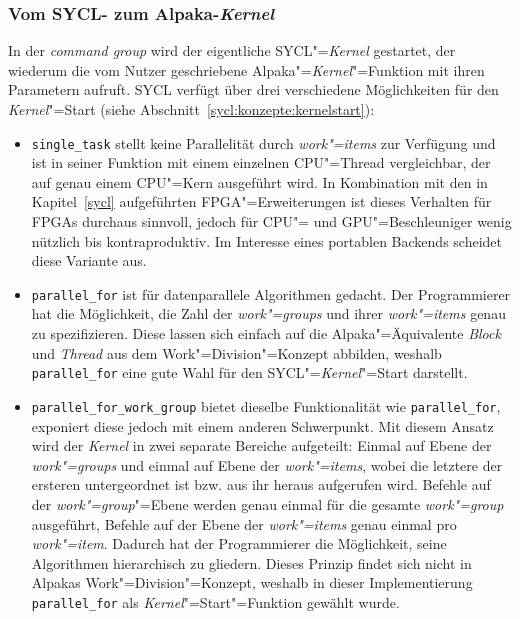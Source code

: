 \subsubsection{Vom SYCL- zum Alpaka-\textit{Kernel}}
\label{implementierung:task:kernel:launch}

In der \textit{command group} wird der eigentliche SYCL"=\textit{Kernel}
gestartet, der wiederum die vom Nutzer geschriebene
Alpaka"=\textit{Kernel}"=Funktion mit ihren Parametern aufruft. SYCL verfügt
über drei verschiedene Möglichkeiten für den \textit{Kernel}"=Start (siehe
Abschnitt~\ref{sycl:konzepte:kernelstart}):

\begin{itemize}
    \item \texttt{single\_task} stellt keine Parallelität durch
          \textit{work"=items} zur Verfügung und ist in seiner Funktion mit
          einem einzelnen CPU"=Thread vergleichbar, der auf genau einem
          CPU"=Kern ausgeführt wird. In Kombination mit den in
          Kapitel~\ref{sycl} aufgeführten FPGA"=Erweiterungen ist dieses
          Verhalten für FPGAs durchaus sinnvoll, jedoch für CPU"= und
          GPU"=Beschleuniger wenig nützlich bis kontraproduktiv. Im Interesse
          eines portablen Backends scheidet diese Variante aus.
    \item \texttt{parallel\_for} ist für datenparallele Algorithmen gedacht.
          Der Programmierer hat die Möglichkeit, die Zahl der
          \textit{work"=groups} und ihrer \textit{work"=items} genau zu
          spezifizieren. Diese lassen sich einfach auf die Alpaka"=Äquivalente
          \textit{Block} und \textit{Thread} aus dem Work"=Division"=Konzept
          abbilden, weshalb \texttt{parallel\_for} eine gute Wahl für den
          SYCL"=\textit{Kernel}"=Start darstellt.
    \item \texttt{parallel\_for\_work\_group} bietet dieselbe Funktionalität wie
          \texttt{parallel\_for}, exponiert diese jedoch mit einem anderen
          Schwerpunkt. Mit diesem Ansatz wird der \textit{Kernel} in zwei
          separate Bereiche aufgeteilt: Einmal auf Ebene der
          \textit{work"=groups} und einmal auf Ebene der \textit{work"=items},
          wobei die letztere der ersteren untergeordnet ist bzw. aus ihr heraus
          aufgerufen wird. Befehle auf der \textit{work"=group}"=Ebene werden
          genau einmal für die gesamte \textit{work"=group} ausgeführt, Befehle
          auf der Ebene der \textit{work"=items} genau einmal pro
          \textit{work"=item}. Dadurch hat der Programmierer die Möglichkeit,
          seine Algorithmen hierarchisch zu gliedern. Dieses Prinzip findet sich
          nicht in Alpakas Work"=Division"=Konzept, weshalb in dieser
          Implementierung \texttt{parallel\_for} als
          \textit{Kernel}"=Start"=Funktion gewählt wurde.
\end{itemize}

